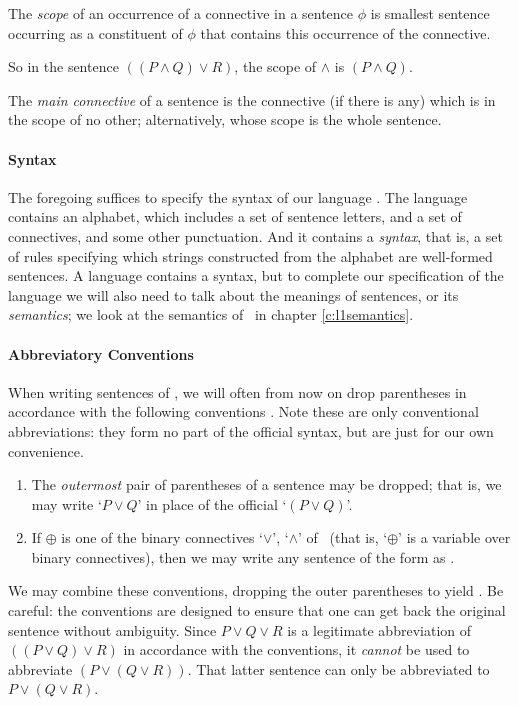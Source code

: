 \begin{definition}[Scope]
		The \emph{scope} of an occurrence of a connective in a sentence $\phi$ is smallest sentence occurring as a constituent of $\phi$ that contains this occurrence of the connective.
\end{definition}
So in the sentence $((P\wedge Q) \vee R)$, the scope of $\wedge$ is $(P \wedge Q)$. 

\begin{definition}
	The \emph{main connective} of a sentence is the connective (if there is any) which is in the scope of no other; alternatively, whose scope is the whole sentence.
\end{definition}



\paragraph{Syntax} The foregoing suffices to specify the syntax of our language \lone. The language contains an alphabet, which includes a set of sentence letters, and a set of connectives, and some other punctuation. And it contains a \emph{syntax}, that is, a set of rules specifying which strings constructed from the alphabet are well-formed sentences. A language contains a syntax, but to complete our specification of the language we will also need to talk about the meanings of sentences, or its \emph{semantics}; we look at the semantics of \lone\ in chapter \ref{c:l1semantics}.

\paragraph{Abbreviatory Conventions} When writing sentences of \lone, we will often from now on drop parentheses in accordance with the following conventions \citep[\S2.3]{hallogma}. Note these are only conventional abbreviations: they form no part of the official syntax, but are just for our own convenience. \begin{enumerate}
	\item The \emph{outermost} pair of parentheses of a sentence may be dropped; that is, we may write `$P \vee Q$' in place of the official `$(P \vee Q)$'.
	\item If $\oplus$ is one of the binary connectives `$\vee$', `$\wedge$' of \lone\ (that is, `$\oplus$' is a variable over binary connectives), then we may write any sentence of the form \cquote{((\phi \oplus \psi)\oplus \chi)} as \cquote{(\phi\oplus\psi\oplus\chi)}.
\end{enumerate}
We may combine these conventions, dropping the outer parentheses to yield \cquote{\phi\oplus\psi\oplus\chi}. Be careful: the conventions are designed to ensure that one can get back the original sentence without ambiguity. Since $P \vee Q \vee R$ is a legitimate abbreviation of $((P \vee Q) \vee R)$ in accordance with the conventions, it \emph{cannot} be used to abbreviate $(P \vee (Q \vee R))$. That latter sentence can only be abbreviated to $P \vee (Q \vee R)$. 



